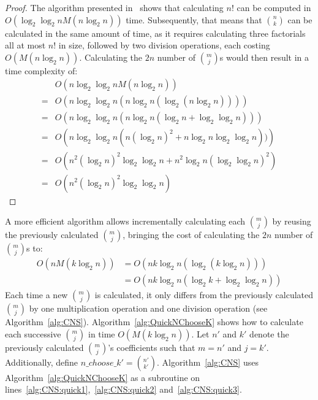 \begin{proof}
The algorithm presented in~\cite{borwein1985complexity} shows that calculating $n!$ can be computed in $O\left(\log_2\log_2 n M(n \log_2 n)\right)$ time. Subsequently, that means that ${n \choose k}$ can be calculated in the same amount of time, as it requires calculating three factorials all at most $n!$ in size, followed by two division operations, each costing $O\left(M(n \log_2 n)\right)$. Calculating the $2n$ number of ${m \choose j}$s would then result in a time complexity of:
\begin{align}
&O\left(n\log_2\log_2 n M(n \log_2 n)\right) \\
=&O\left(n\log_2\log_2 n (n \log_2 n(\log_2 (n \log_2 n)))\right) \\
=&O\left(n\log_2\log_2 n (n \log_2 n(\log_2 n + \log_2\log_2 n))\right) \\
=&O\left(n\log_2\log_2 n (n (\log_2 n)^2 + n \log_2 n \log_2\log_2 n))\right)\\
=&O\left(n^2 (\log_2 n)^2 \log_2\log_2 n + n^2 \log_2 n (\log_2\log_2 n)^2\right) \\
=&O\left(n^2 (\log_2 n)^2 \log_2\log_2 n\right)
\end{align}
\end{proof}
A more efficient algorithm allows incrementally calculating each ${m \choose j}$ by reusing the previously calculated ${m \choose j}$, bringing the cost of calculating the $2n$ number of ${m \choose j}$s to:
\begin{align}
O\left(n M(k \log_2 n)\right) &= O\left(n k \log_2 n(\log_2(k \log_2 n))\right)\\
&= O\left(n k \log_2 n(\log_2 k + \log_2\log_2 n)\right)
\end{align}
Each time a new ${m \choose j}$ is calculated, it only differs from the previously calculated ${m \choose j}$ by one multiplication operation and one division operation (see Algorithm~\ref{alg:CNS}). Algorithm~\ref{alg:QuickNChooseK} shows how to calculate each successive ${m \choose j}$ in time $O\left(M(k \log_2 n)\right)$. Let $n'$ and $k'$ denote the previously calculated ${m \choose j}$'s coefficients such that $m = n'$ and $j = k'$. Additionally, define $n\_choose\_k'= {n' \choose k'}$. Algorithm~\ref{alg:CNS} uses Algorithm~\ref{alg:QuickNChooseK} as a subroutine on lines~\ref{alg:CNS:quick1},~\ref{alg:CNS:quick2} and~\ref{alg:CNS:quick3}.

